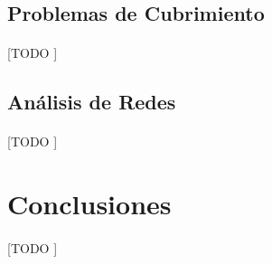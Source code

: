 \documentclass{subfiles}
\begin{document}
      \subsection{Problemas de Cubrimiento}
      \label{sec:network_covering}

        \paragraph{}
        [TODO ]

      \subsection{Análisis de Redes}
      \label{sec:network_analysis}

        \paragraph{}
        [TODO ]

    \section{Conclusiones}
    \label{sec:graphs_conclusions}

      \paragraph{}
      [TODO ]
\end{document}
